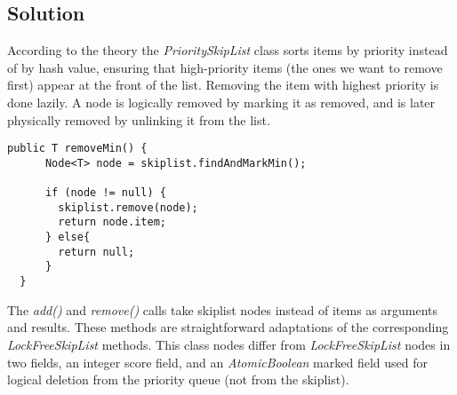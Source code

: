 \subsection{Solution}
\par
According to the theory the \textit{PrioritySkipList} class sorts items by priority instead of by hash value, ensuring that high-priority items (the ones we want to remove first) appear at the front of the list. Removing the item with highest priority is done lazily. A node is logically removed by marking it as removed, and is later physically removed by unlinking it from the list.
\par
\begin{lstlisting}[frame=single,breaklines=true]
  public T removeMin() {
      Node<T> node = skiplist.findAndMarkMin();
    
      if (node != null) {
        skiplist.remove(node);
        return node.item;
      } else{
        return null;
      }
  }
\end{lstlisting}
\par
The \textit{add()} and \textit{remove()} calls take skiplist nodes instead of items as arguments and results. These methods are straightforward adaptations of the corresponding \textit{LockFreeSkipList} methods. This class nodes differ from \textit{LockFreeSkipList} nodes in two fields, an integer score field, and an \textit{AtomicBoolean} marked field used for logical deletion from the priority queue (not from the skiplist).
